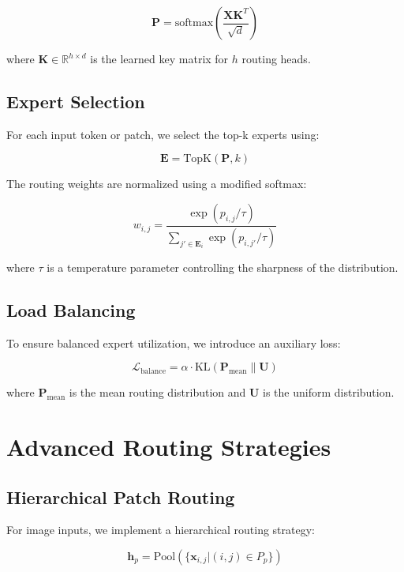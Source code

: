 \documentclass[10pt,journal,compsoc]{IEEEtran}
\begin{document}
\begin{equation}
    \mathbf{P} = \text{softmax}\left(\frac{\mathbf{X}\mathbf{K}^T}{\sqrt{d}}\right)
\end{equation}

where $\mathbf{K} \in \mathbb{R}^{h \times d}$ is the learned key matrix for $h$ routing heads.

\subsection{Expert Selection}
For each input token or patch, we select the top-k experts using:

\begin{equation}
    \mathbf{E} = \text{TopK}(\mathbf{P}, k)
\end{equation}

The routing weights are normalized using a modified softmax:

\begin{equation}
    w_{i,j} = \frac{\exp(p_{i,j}/\tau)}{\sum_{j' \in \mathbf{E}_i} \exp(p_{i,j'}/\tau)}
\end{equation}

where $\tau$ is a temperature parameter controlling the sharpness of the distribution.

\subsection{Load Balancing}
To ensure balanced expert utilization, we introduce an auxiliary loss:

\begin{equation}
    \mathcal{L}_{\text{balance}} = \alpha \cdot \text{KL}(\mathbf{P}_{\text{mean}} \| \mathbf{U})
\end{equation}

where $\mathbf{P}_{\text{mean}}$ is the mean routing distribution and $\mathbf{U}$ is the uniform distribution.

\section{Advanced Routing Strategies}

\subsection{Hierarchical Patch Routing}
For image inputs, we implement a hierarchical routing strategy:

\begin{equation}
    \mathbf{h}_p = \text{Pool}(\{\mathbf{x}_{i,j} | (i,j) \in P_p\})
\end{equation}
\end{document}
